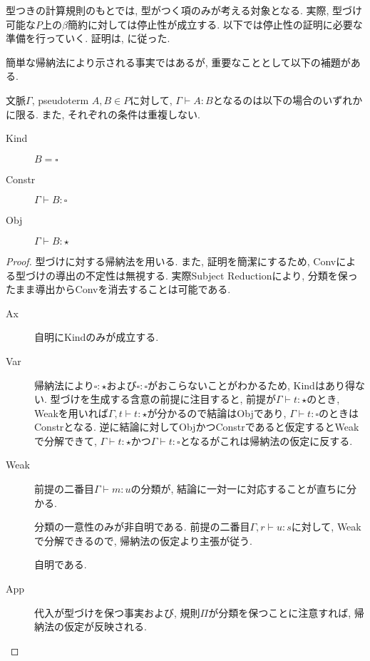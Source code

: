 \documentclass[12pt, titlepage]{ltjsarticle}
\begin{document}
型つきの計算規則のもとでは, 型がつく項のみが考える対象となる. 実際, 型づけ可能な$P$上の$\beta$簡約に対しては停止性が成立する. 以下では停止性の証明に必要な準備を行っていく. 証明は\cite{geuvers1994short}, \cite{girard1989proofs}に従った.

簡単な帰納法により示される事実ではあるが, 重要なこととして以下の補題がある.

\begin{lem}[Classification]\label{clsfy}
 文脈$\Gamma$, pseudoterm $A, B \in P$に対して, $\Gamma \vdash A \colon B$となるのは以下の場合のいずれかに限る. また, それぞれの条件は重複しない.
 \begin{description}
  \item[Kind] $B = \square$
  \item[Constr] $\Gamma \vdash B {\colon} {\square}$
  \item[Obj] $\Gamma \vdash B {\colon} {\star}$
 \end{description}
\end{lem}
\begin{proof}
 型づけに対する帰納法を用いる. また, 証明を簡潔にするため, Convによる型づけの導出の不定性は無視する. 実際Subject Reductionにより, 分類を保ったまま導出からConvを消去することは可能である.
 \begin{description}
  \item[Ax] 自明にKindのみが成立する.
  \item[Var] 帰納法により$\square \colon \star$および$\square \colon \square$がおこらないことがわかるため, Kindはあり得ない. 型づけを生成する含意の前提に注目すると, 前提が$\Gamma \vdash t {\colon} {\star}$のとき, Weakを用いれば$\Gamma, t \vdash t {\colon} {\star}$が分かるので結論はObjであり, $\Gamma \vdash t {\colon} {\square}$のときはConstrとなる. 逆に結論に対してObjかつConstrであると仮定するとWeakで分解できて, $\Gamma \vdash t {\colon} {\star}$かつ$\Gamma \vdash t {\colon} {\square}$となるがこれは帰納法の仮定に反する.
  \item[Weak] 前提の二番目$\Gamma \vdash m {\colon} u$の分類が, 結論に一対一に対応することが直ちに分かる.
  \item[\Pi] 分類の一意性のみが非自明である. 前提の二番目$\Gamma, r \vdash u {\colon} s$に対して, Weakで分解できるので, 帰納法の仮定より主張が従う.
  \item[\lambda] 自明である.
  \item[App] 代入が型づけを保つ事実および, 規則$\Pi$が分類を保つことに注意すれば, 帰納法の仮定が反映される.
 \end{description}
\end{proof}
\end{document}
